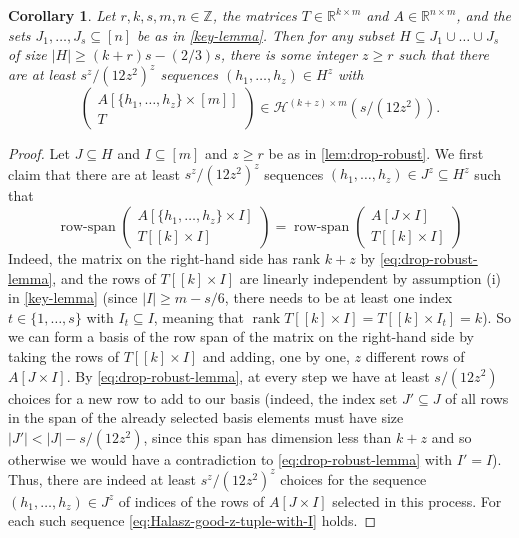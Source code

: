 \documentclass[english]{article}
\newtheorem{corollary}[theorem]{Corollary}
\theoremstyle{remark}
\numberwithin{equation}{section}
\numberwithin{figure}{section}
\newcommand{\su}{\subseteq}
\newcommand{\RR}{\mathbb{R}}
\newcommand{\mc}{\mathcal}
\newcommand{\on}{\operatorname}
\begin{document}
\begin{corollary}\label{cor:drop-robust}
Let $r,k,s,m,n\in \mathbb{Z}$, the matrices $T\in \RR^{k\times m}$ and $A\in \RR^{n\times m}$, and the sets $J_1,\dots,J_s\su [n]$ be as in \cref{key-lemma}. Then for any subset $H\su J_1\cup\dots\cup J_s$ of size $|H|\ge (k+r)s-(2/3)s$, there is some integer $z\ge r$ such that there are at least $s^z/(12z^2)^z$ sequences $(h_1,\dots,h_z)\in H^z$ with
\begin{equation}\label{eq:Halasz-good-z-tuple}
\begin{pmatrix}A[\{h_{1},\dots,h_{z}\}\times[m]]\\
T
\end{pmatrix}\in \mc H^{(k+z)\times m}(s/(12z^2)).
\end{equation}
\end{corollary}
\begin{proof}
    Let $J\subseteq H$ and $I\subseteq [m]$ and $z\ge r$ be as in \cref{lem:drop-robust}. We first claim that there are at least $s^z/(12z^2)^z$ sequences $(h_1,\dots,h_z)\in J^z\su H^z$ such that
    \begin{equation}\label{eq:Halasz-good-z-tuple-with-I}
    \on{row-span}\begin{pmatrix}A[\{h_{1},\dots,h_{z}\}\times I]\\
    T[[k]\times I]
    \end{pmatrix}
    =\on{row-span}\begin{pmatrix}A[J\times I]\\
    T[[k]\times I]
    \end{pmatrix}
    \end{equation}
    Indeed, the matrix on the right-hand side has rank $k+z$ by \cref{eq:drop-robust-lemma}, and the rows of $T[[k]\times I]$ are linearly independent by assumption (i) in \cref{key-lemma} (since $|I|\ge m-s/6$, there needs to be at least one index $t\in \{1,\dots,s\}$ with $I_t\su I$, meaning that $\on{rank} T[[k]\times I]=T[[k]\times I_t]=k$). So we can form a basis of the row span of the matrix on the right-hand side by taking the rows of $T[[k]\times I]$ and adding, one by one, $z$ different rows of $A[J\times I]$. By \cref{eq:drop-robust-lemma}, at every step we have at least $s/(12z^2)$ choices for a new row to add to our basis (indeed, the index set $J'\su J$ of all rows in the span of the already selected basis elements must have size $|J'|<|J|-s/(12z^2)$, since this span has dimension less than $k+z$ and so otherwise we would have a contradiction to \cref{eq:drop-robust-lemma} with $I'=I$). Thus, there are indeed at least $s^z/(12z^2)^z$ choices for the sequence $(h_1,\dots,h_z)\in J^z$ of indices of the rows of $A[J\times I]$ selected in this process. For each such sequence \cref{eq:Halasz-good-z-tuple-with-I} holds.


\end{proof}
\end{document}
